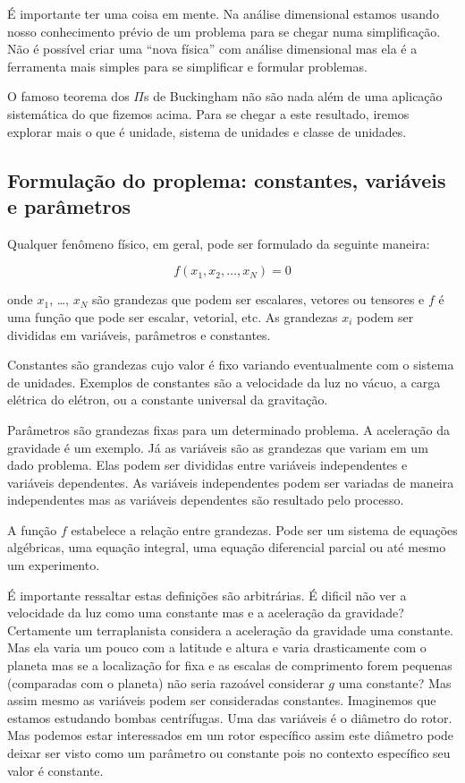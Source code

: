 É importante ter uma coisa em mente. Na análise dimensional estamos usando nosso conhecimento prévio de um problema para se chegar numa simplificação. Não é possível criar uma ``nova física'' com análise dimensional mas ela é a ferramenta mais simples para se simplificar e formular problemas.

O famoso teorema dos $\Pi$s de Buckingham não são nada além de uma aplicação sistemática do que fizemos acima. Para se chegar a este resultado, iremos explorar mais o que é unidade, sistema de unidades e classe de unidades.

\subsection{Formulação do proplema: constantes, variáveis e parâmetros}

Qualquer fenômeno físico, em geral,  pode ser formulado da seguinte maneira:

\[
f\left(x_1, x_2, \ldots, x_N\right) = 0
\]

onde $x_1$, \ldots, $x_N$ são grandezas que podem ser escalares, vetores ou tensores e $f$ é uma função que pode ser escalar, vetorial, etc. As grandezas $x_i$ podem ser divididas em variáveis, parâmetros e constantes.

Constantes são grandezas cujo valor é fixo variando eventualmente com o sistema de unidades. Exemplos de constantes são a velocidade da luz no vácuo, a carga elétrica do elétron, ou a constante universal da gravitação.

Parâmetros são grandezas fixas para um determinado problema. A aceleração da gravidade é um exemplo. Já as variáveis são as grandezas que variam em um dado problema. Elas podem ser divididas entre variáveis independentes e variáveis dependentes. As variáveis independentes podem ser variadas de maneira independentes mas as variáveis dependentes são resultado pelo processo.

A função $f$ estabelece a relação entre grandezas. Pode ser um sistema de equações algébricas, uma equação integral, uma equação diferencial parcial ou até mesmo um experimento.

É importante ressaltar estas definições são arbitrárias. É dificil não ver a velocidade da luz como uma constante mas e a aceleração da gravidade? Certamente um terraplanista considera a aceleração da gravidade uma constante. Mas ela varia um pouco com a latitude e altura e varia drasticamente com o planeta mas se a localização for fixa e as escalas de comprimento forem pequenas (comparadas com o planeta) não seria razoável considerar $g$ uma constante? Mas assim mesmo as variáveis podem ser consideradas constantes. Imaginemos que estamos estudando bombas centrífugas. Uma das variáveis é o diâmetro do rotor. Mas podemos estar interessados em um rotor específico assim este diâmetro pode deixar ser visto como um parâmetro ou constante pois no contexto específico seu valor é constante.

